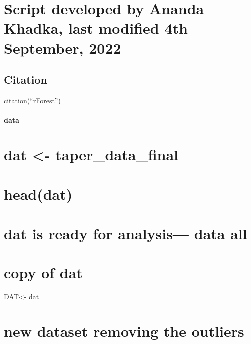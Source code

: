 \documentclass[
]{article}
\begin{document}
\hypertarget{script-developed-by-ananda-khadka-last-modified-4th-september-2022}{%
\section{Script developed by Ananda Khadka, last modified 4th September,
2022}\label{script-developed-by-ananda-khadka-last-modified-4th-september-2022}}

\hypertarget{citation}{%
\subsection{Citation}\label{citation}}

citation(``rForest'')

\hypertarget{data}{%
\paragraph{data}\label{data}}

\hypertarget{dat---taper_data_final}{%
\section{dat \textless-
taper\_data\_final}\label{dat---taper_data_final}}

\hypertarget{headdat}{%
\section{head(dat)}\label{headdat}}

\hypertarget{dat-is-ready-for-analysis-data-all}{%
\section{dat is ready for analysis--- data
all}\label{dat-is-ready-for-analysis-data-all}}

\hypertarget{copy-of-dat}{%
\section{copy of dat}\label{copy-of-dat}}

DAT\textless- dat

\hypertarget{new-dataset-removing-the-outliers}{%
\section{new dataset removing the
outliers}\label{new-dataset-removing-the-outliers}}
\end{document}
